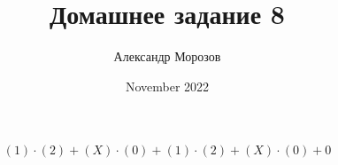 \documentclass{article}
\title{Домашнее задание 8}
\author{Александр Морозов}
\date{November 2022}
\begin{document}
    \[{{{{({1})\cdot({2})}+{({X})\cdot({0})}}+{{({1})\cdot({2})}+{({X})\cdot({0})}}}+{0}}\]

	
\end{document}
